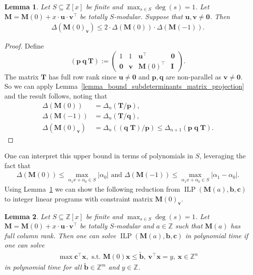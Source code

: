 \documentclass[a4paper, 11pt]{article}
\DeclareMathOperator{\ILP}{ILP}
\newcommand{\Z}{\mathbb{Z}}
\newcommand{\bx}{\bm{x}}
\newcommand{\bc}{\bm{c}}
\newcommand{\bb}{\bm{b}}
\newcommand{\bp}{\bm{p}}
\newcommand{\bq}{\bm{q}}
\newcommand{\bv}{\bm{v}}
\newcommand{\bu}{\bm{u}}
\newcommand{\bM}{\bm{M}}
\newcommand{\bT}{\bm{T}}
\newcommand{\indet}{x}
\newcommand{\intvar}{a}
\newcommand{\polyring}{\Z[\indet]}
\newcommand{\polyS}{S}
\newcommand{\polyM}{\bM}
\newcommand{\id}{\bm{I}}
\newcommand{\zero}{\bm{0}}
\newtheorem{lemma}{Lemma}
\begin{document}
	\begin{lemma}
		\label{lemma_bounded_subdeterminants}
		Let $S\subseteq \polyring$ be finite and $\max_{s\in S} \deg(s) = 1$. Let $\polyM = \bM(0) + \indet\cdot\bu\cdot\bv^\top$ be totally $\polyS$-modular. Suppose that $\bu,\bv\neq \bm{0}$. Then  
		\begin{align*}
			\Delta\left(\bM(0)_{\bv}\right)\leq 2\cdot\Delta(\bM(0))\cdot\Delta(\bM(-1)).
		\end{align*}
	\end{lemma}
	\begin{proof}%
		Define
		\[
		\left(\bp\ \bq\ \bT\right):=\left(\begin{array}{cccc}
			1 & 1 & \bu^{\top} & \zero \\
			\zero & \bv & \bM(0)^{\top} & \id
		\end{array}\right).
		\]	
		The matrix $\bT$ has full row rank since $\bu\neq \bm{0}$ and $\bp,\bq$ are non-parallel as $\bv\neq \bm{0}$. So we can apply Lemma~\ref{lemma_bound_subdeterminants_matrix_projection} and the result follows, noting that
		\begin{align*}
			\Delta(\bM(0))&=\Delta_n(\bT/\bp),\\
			\Delta(\bM(-1))&=\Delta_n(\bT/\bq),\\
			\Delta(\bM(0)_{\bv})&=\Delta_n((\bq\;\bT)/\bp)\leq\Delta_{n+1}(\bp\;\bq\;\bT).
		\end{align*}
	\end{proof}
	
	One can interpret this upper bound in terms of polynomials in $\polyS$, leveraging the fact that
	\begin{align*}
		\Delta\left(\bM(0)\right) \leq \max_{\alpha_1\indet+\alpha_0\in S}|\alpha_0| \text{ and }\Delta\left(\bM(-1)\right) \leq \max_{\alpha_1\indet+\alpha_0\in S}|\alpha_1-\alpha_0|.
	\end{align*}
	Using Lemma~\ref{lemma_bounded_subdeterminants} we can show the following reduction from $\ILP(\bM(\intvar),\bb,\bc)$ to integer linear programs with constraint matrix $\bM(0)_{\bv}$.
	
	\begin{lemma}
		\label{lemma_reduction}
		Let $S\subseteq \polyring$ be finite and $\max_{s\in S} \deg(s) = 1$. Let $\polyM = \bM(0) + \indet\cdot\bu\cdot\bv^\top$ be totally $\polyS$-modular and $\intvar\in\Z$ such that $\bM(\intvar)$ has full column rank. Then one can solve $\ILP(\bM(\intvar),\bb,\bc)$ in polynomial time if one can solve
		\begin{align*}
			\max \bc^\top\bx, \text{ s.t. } \bM(0)\bx\leq\tilde{\bb}, \ \bv^\top\bx = y, \ \bx\in\Z^n
		\end{align*}
		in polynomial time for all $\tilde{\bb}\in\Z^{m}$ and $y\in\Z$.
	\end{lemma}
	
\end{document}
